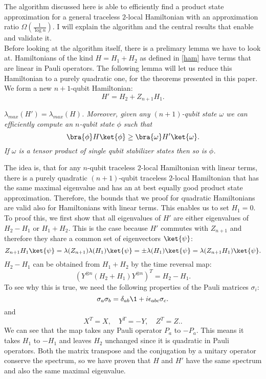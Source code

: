 The algorithm discussed here is able to efficiently find a product state approximation for a general traceless $2$-local Hamiltonian with an approximation ratio $\Omega(\frac{1}{\log n})$\cite{bravyi19}.
I will explain the algorithm and the central results that enable and validate it.\\
Before looking at the algorithm itself, there is a prelimary lemma we have to look at.
Hamiltonians of the kind $H = H_1+H_2$ as defined in \eqref{ham} have terms that are linear in Pauli operators.
The following lemma will let us reduce this Hamiltonian to a purely quadratic one, for the theorems presented in this paper.
We form a new $n+1$-qubit Hamiltonian: \[
H'=H_2+Z_{n+1}H_1
.\]

\begin{lma}
	\emph{$\lambda_{max}\left( H' \right) =\lambda_{max}\left( H \right)$. Moreover, given any $(n+1)$-qubit state  $\omega$ we can efficiently compute an $n$-qubit state $\phi$ such that \[
	\bra{\phi}H\ket{\phi} \ge \bra{\omega}H'\ket{\omega}
	.\]
If $\omega$ is a tensor product of single qubit stabilizer states then so is $\phi$.}
\end{lma}
The idea is, that for any $n$-qubit traceless $2$-local Hamiltonian with linear terms, there is a purely quadratic $(n+1)$-qubit traceless $2$-local Hamiltonian that has the same maximal eigenvalue and has an at best equally good product state approximation.
Therefore, the bounds that we proof for quadratic Hamiltonians are valid also for Hamiltonians with linear terms.
This enables us to set $H_1=0$.
To proof this, we first show that all eigenvalues of $H'$ are either eigenvalues of $H_2-H_1$ or $H_1+H_2$.
This is the case because $H'$ commutes with $Z_{n+1}$ and therefore they share a common set of eigenvectors $\ket{\psi}$: \[
Z_{n+1}H_1\ket{\psi} = \lambda(Z_{n+1})\lambda(H_1)\ket{\psi}=\pm \lambda(H_1)\ket{\psi} = \lambda(Z_{n+1}H_1)\ket{\psi}
.\]
$H_2-H_1$ can be obtained from $H_1+H_2$ by the time reversal map:
\[
	\left( Y^{\otimes n}\left( H_2+H_1 \right) Y^{\otimes n} \right) ^{T} = H_2-H_1
.\]
To see why this is true, we need the following properties of the Pauli matrices $\sigma_{i}$: \[
	\sigma_a\sigma_b=\delta_{ab}\1 + i\epsilon_{abc}\sigma_c
.\]
and \[
	X^{T}=X, \quad Y^{T}=-Y, \quad Z^{T}=Z.
.\]
We can see that the map takes any Pauli operator $P_a$ to $-P_a$.
This means it takes  $H_1$ to $-H_1$ and leaves $H_2$ unchanged since it is quadratic in Pauli operators.
Both the matrix transpose and the conjugation by a unitary operator conserve the spectrum, so we have proven that  $H$ and $H'$ have the same spectrum and also the same maximal eigenvalue.
